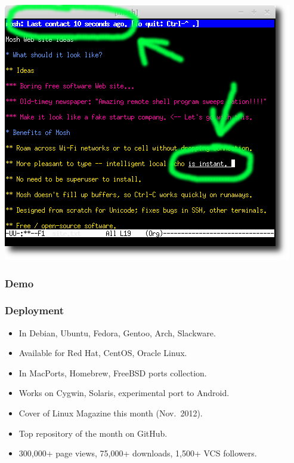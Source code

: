 \documentclass[svgnames]{beamer}
\begin{document}
\begin{frame}

\noindent \includegraphics[scale=.5]{mosh.png}

\end{frame}

\begin{frame}
\frametitle{Demo}

\end{frame}

\begin{frame}
\frametitle{Deployment}

\begin{itemize}
\item In Debian, Ubuntu, Fedora, Gentoo, Arch, Slackware.

\item Available for Red Hat, CentOS, Oracle Linux.

\item In MacPorts, Homebrew, FreeBSD ports collection.

\item Works on Cygwin, Solaris, experimental port to Android.

\item Cover of Linux Magazine this month (Nov.~2012).

\item Top repository of the month on GitHub.

\item 300,000+ page views, 75,000+ downloads, 1,500+ VCS followers.

\end{itemize}

\end{frame}
\end{document}
